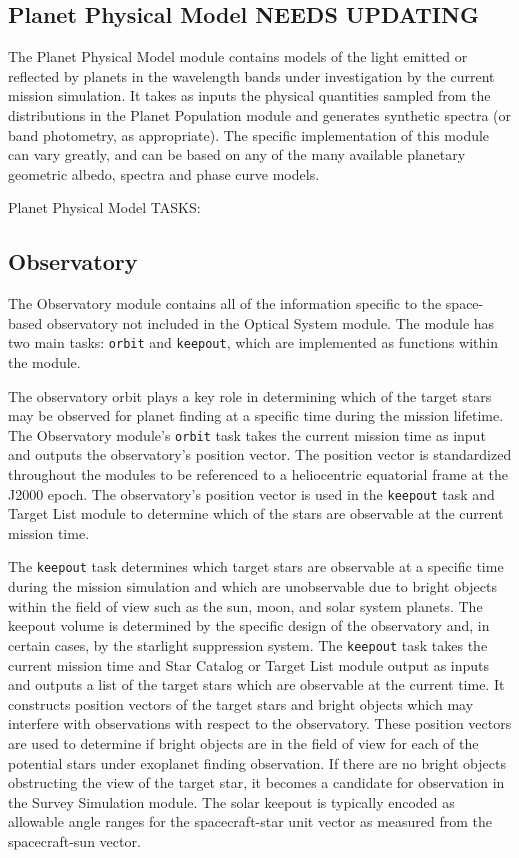 \documentclass[cleanfoot]{asme2ej}
\begin{document}

\subsection{Planet Physical Model NEEDS UPDATING} \label{sec:planetphysicalmodel}
The Planet Physical Model module contains models of the light emitted or reflected by planets in the wavelength bands under investigation by the current mission simulation.  It takes as inputs the physical quantities sampled from the distributions in the Planet Population module and generates synthetic spectra (or band photometry, as appropriate).  The specific implementation of this module can vary greatly, and can be based on any of the many available planetary geometric albedo, spectra and phase curve models.

Planet Physical Model TASKS:


\subsection{Observatory}
The Observatory module contains all of the information specific to the space-based observatory not included in the Optical System module. The module has two main tasks: \verb+orbit+ and \verb+keepout+, which are implemented as functions within the module. 

The observatory orbit plays a key role in determining which of the target stars may be observed for planet finding at a specific time during the mission lifetime. The Observatory module's \verb+orbit+ task takes the current mission time as input and outputs the observatory's position vector. The position vector is standardized throughout the modules to be referenced to a heliocentric equatorial frame at the J2000 epoch. The observatory's position vector is used in the \verb+keepout+ task and Target List module to determine which of the stars are observable at the current mission time.

The \verb+keepout+ task determines which target stars are observable at a specific time during the mission simulation and which are unobservable due to bright objects within the field of view such as the sun, moon, and solar system planets.  The keepout volume is determined by the specific design of the observatory and, in certain cases, by the starlight suppression system.  The \verb+keepout+ task takes the current mission time and Star Catalog or Target List module output as inputs and outputs a list of the target stars which are observable at the current time. It constructs position vectors of the target stars and bright objects which may interfere with observations with respect to the observatory. These position vectors are used to determine if bright objects are in the field of view for each of the potential stars under exoplanet finding observation.  If there are no bright objects obstructing the view of the target star, it becomes a candidate for observation in the Survey Simulation module.  The solar keepout is typically encoded as allowable angle ranges for the spacecraft-star unit vector as measured from the spacecraft-sun vector.
\end{document}
